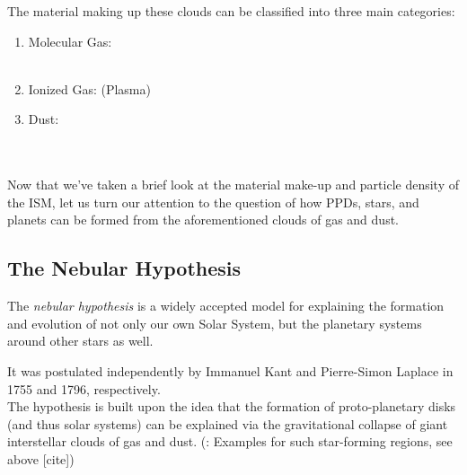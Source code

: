         The material making up these clouds can be classified into three main categories:
        \begin{enumerate}
            \item Molecular Gas: \\
                 \\
            \item Ionized Gas: (Plasma) \\ 
                \todo{}
            \item Dust: \\
                 \\
                 \\
        \end{enumerate}

        Now that we've taken a brief look at the material make-up and particle density of the ISM, 
        let us turn our attention to the question of how PPDs, stars, and planets can be formed 
        from the aforementioned clouds of gas and dust.

    \subsection{The Nebular Hypothesis}

        The \textit{nebular hypothesis} is a widely accepted model for explaining the formation and 
        evolution of not only our own Solar System, but the planetary systems around other stars as 
        well. 

        It was postulated independently by Immanuel Kant        %
        and Pierre-Simon Laplace                                %
        in 1755 and 1796, respectively. \\                      %

        The hypothesis is built upon the idea that the formation of proto-planetary disks (and thus 
        solar systems) can be explained via the gravitational collapse of giant interstellar clouds 
        of gas and dust. (\todo: Examples for such star-forming regions, see above [cite]) \\

